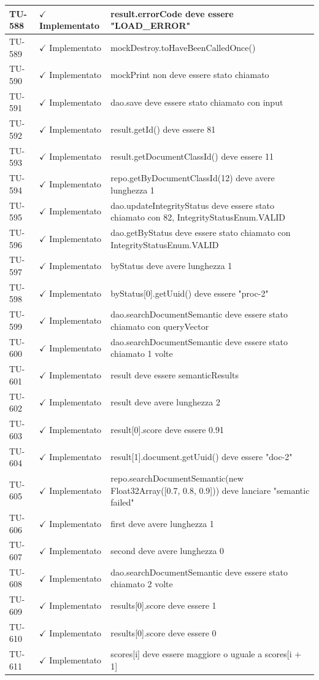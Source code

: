 ﻿\documentclass[a4paper,12pt]{article}
\newcommand{\ok}{\textcolor{green!60!black}{$\checkmark$ Implementato}}
\begin{document}
\begin{longtable}{|p{2cm}|p{3.5cm}|p{9.5cm}|}
\hline
TU-588 & \ok & result.errorCode deve essere "LOAD\_ERROR" \\
\hline
TU-589 & \ok & mockDestroy.toHaveBeenCalledOnce() \\
\hline
TU-590 & \ok & mockPrint non deve essere stato chiamato \\
\hline
TU-591 & \ok & dao.save deve essere stato chiamato con input \\
\hline
TU-592 & \ok & result.getId() deve essere 81 \\
\hline
TU-593 & \ok & result.getDocumentClassId() deve essere 11 \\
\hline
TU-594 & \ok & repo.getByDocumentClassId(12) deve avere lunghezza 1 \\
\hline
TU-595 & \ok & dao.updateIntegrityStatus deve essere stato chiamato con 82, IntegrityStatusEnum.VALID \\
\hline
TU-596 & \ok & dao.getByStatus deve essere stato chiamato con IntegrityStatusEnum.VALID \\
\hline
TU-597 & \ok & byStatus deve avere lunghezza 1 \\
\hline
TU-598 & \ok & byStatus[0].getUuid() deve essere "proc-2" \\
\hline
TU-599 & \ok & dao.searchDocumentSemantic deve essere stato chiamato con queryVector \\
\hline
TU-600 & \ok & dao.searchDocumentSemantic deve essere stato chiamato 1 volte \\
\hline
TU-601 & \ok & result deve essere semanticResults \\
\hline
TU-602 & \ok & result deve avere lunghezza 2 \\
\hline
TU-603 & \ok & result[0].score deve essere 0.91 \\
\hline
TU-604 & \ok & result[1].document.getUuid() deve essere "doc-2" \\
\hline
TU-605 & \ok & repo.searchDocumentSemantic(new Float32Array([0.7, 0.8, 0.9])) deve lanciare "semantic failed" \\
\hline
TU-606 & \ok & first deve avere lunghezza 1 \\
\hline
TU-607 & \ok & second deve avere lunghezza 0 \\
\hline
TU-608 & \ok & dao.searchDocumentSemantic deve essere stato chiamato 2 volte \\
\hline
TU-609 & \ok & results[0].score deve essere 1 \\
\hline
TU-610 & \ok & results[0].score deve essere 0 \\
\hline
TU-611 & \ok & scores[i] deve essere maggiore o uguale a scores[i + 1] \\

\end{longtable}
\end{document}
